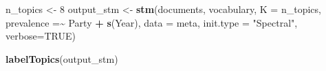\documentclass[
]{book}
\newenvironment{Shaded}{\begin{snugshade}}{\end{snugshade}}
\newcommand{\AttributeTok}[1]{\textcolor[rgb]{0.13,0.29,0.53}{#1}}
\newcommand{\ConstantTok}[1]{\textcolor[rgb]{0.56,0.35,0.01}{#1}}
\newcommand{\DecValTok}[1]{\textcolor[rgb]{0.00,0.00,0.81}{#1}}
\newcommand{\FunctionTok}[1]{\textcolor[rgb]{0.13,0.29,0.53}{\textbf{#1}}}
\newcommand{\NormalTok}[1]{#1}
\newcommand{\OtherTok}[1]{\textcolor[rgb]{0.56,0.35,0.01}{#1}}
\newcommand{\SpecialCharTok}[1]{\textcolor[rgb]{0.81,0.36,0.00}{\textbf{#1}}}
\newcommand{\StringTok}[1]{\textcolor[rgb]{0.31,0.60,0.02}{#1}}
\begin{document}
\begin{Shaded}
\begin{Highlighting}[]
\NormalTok{n\_topics }\OtherTok{\textless{}{-}} \DecValTok{8}
\NormalTok{output\_stm }\OtherTok{\textless{}{-}} \FunctionTok{stm}\NormalTok{(documents, vocabulary, }\AttributeTok{K =}\NormalTok{ n\_topics, }\AttributeTok{prevalence =}\SpecialCharTok{\textasciitilde{}}\NormalTok{ Party }\SpecialCharTok{+} \FunctionTok{s}\NormalTok{(Year), }\AttributeTok{data =}\NormalTok{ meta, }\AttributeTok{init.type =} \StringTok{"Spectral"}\NormalTok{, }\AttributeTok{verbose=}\ConstantTok{TRUE}\NormalTok{)}
\end{Highlighting}
\end{Shaded}

\begin{Shaded}
\begin{Highlighting}[]
\FunctionTok{labelTopics}\NormalTok{(output\_stm)}
\end{Highlighting}
\end{Shaded}
\end{document}
